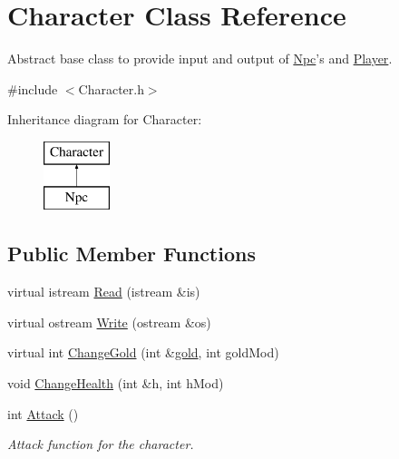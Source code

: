 \hypertarget{classCharacter}{\section{Character Class Reference}
\label{classCharacter}
}


Abstract base class to provide input and output of \hyperlink{classNpc}{Npc}'s and \hyperlink{classPlayer}{Player}.  




{\ttfamily \#include $<$Character.\-h$>$}

Inheritance diagram for Character\-:\begin{figure}[H]
\begin{center}
\leavevmode
\includegraphics[height=2.000000cm]{classCharacter}
\end{center}
\end{figure}
\subsection*{Public Member Functions}
\begin{DoxyCompactItemize}
\item 
virtual istream \hyperlink{classCharacter_a21de96f408a3db5e0734012c27587c8c}{Read} (istream \&is)
\item 
virtual ostream \hyperlink{classCharacter_ab1af9d183d124e11e46d4b2868f846dc}{Write} (ostream \&os)
\item 
virtual int \hyperlink{classCharacter_a250678a82a39b73cc3c622b9e88a7877}{Change\-Gold} (int \&\hyperlink{classCharacter_ab8dd866071dba429a35555e0c372e162}{gold}, int gold\-Mod)
\item 
void \hyperlink{classCharacter_a39bd3a1eca5362f69aea167bda1b336e}{Change\-Health} (int \&h, int h\-Mod)
\item 
\hypertarget{classCharacter_afaa737ad669c882598bb65f5f6c57376}{int \hyperlink{classCharacter_afaa737ad669c882598bb65f5f6c57376}{Attack} ()}\label{classCharacter_afaa737ad669c882598bb65f5f6c57376}

\begin{DoxyCompactList}\small\item\em Attack function for the character. \end{DoxyCompactList}\end{DoxyCompactItemize}
